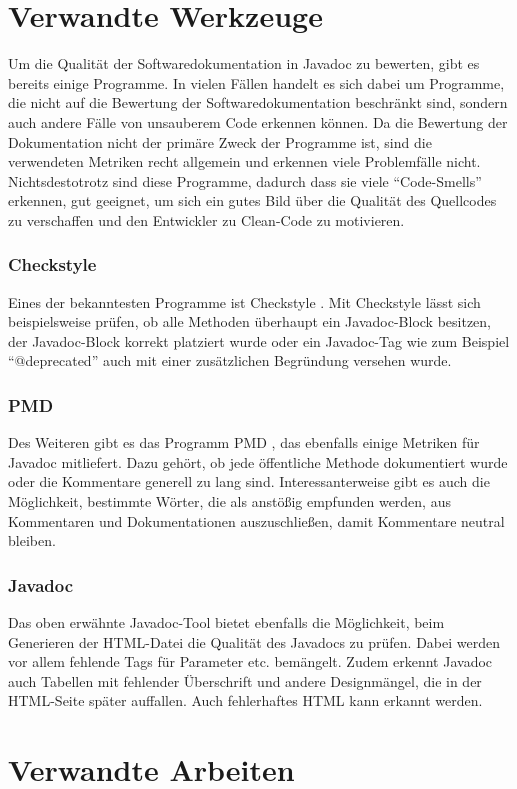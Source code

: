 \section{Verwandte Werkzeuge}
Um die Qualität der Softwaredokumentation in Javadoc zu bewerten, gibt es bereits einige Programme. In vielen Fällen handelt es sich dabei um Programme, die nicht auf die Bewertung der Softwaredokumentation beschränkt sind, sondern auch andere Fälle von unsauberem Code erkennen können. Da die Bewertung der Dokumentation nicht der primäre Zweck der Programme ist, sind die verwendeten Metriken recht allgemein und erkennen viele Problemfälle nicht. Nichtsdestotrotz sind diese Programme, dadurch dass sie viele \enquote{Code-Smells} erkennen, gut geeignet, um sich ein gutes Bild über die Qualität des Quellcodes zu verschaffen und den Entwickler zu Clean-Code zu motivieren. 
\subsubsection{Checkstyle}
Eines der bekanntesten Programme ist Checkstyle \cite{Checkstyle}. Mit Checkstyle lässt sich beispielsweise prüfen, ob alle Methoden überhaupt ein Javadoc-Block besitzen, der Javadoc-Block korrekt platziert wurde oder ein Javadoc-Tag wie zum Beispiel \enquote{@deprecated} auch mit einer zusätzlichen Begründung versehen wurde. 
\subsubsection{PMD}
Des Weiteren gibt es das Programm PMD \cite{PMD}, das ebenfalls einige Metriken für Javadoc mitliefert. Dazu gehört, ob jede öffentliche Methode dokumentiert wurde oder die Kommentare generell zu lang sind. Interessanterweise gibt es auch die Möglichkeit, bestimmte Wörter, die als anstößig empfunden werden, aus Kommentaren und Dokumentationen auszuschließen, damit Kommentare neutral bleiben. 
\subsubsection{Javadoc}
Das oben erwähnte Javadoc-Tool bietet ebenfalls die Möglichkeit, beim Generieren der HTML-Datei die Qualität des Javadocs zu prüfen. Dabei werden vor allem fehlende Tags für Parameter etc. bemängelt. Zudem erkennt Javadoc auch Tabellen mit fehlender Überschrift und andere Designmängel, die in der HTML-Seite später auffallen. Auch fehlerhaftes HTML kann erkannt werden.

\section{Verwandte Arbeiten}

